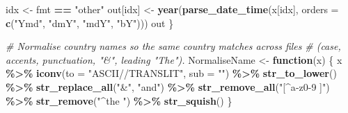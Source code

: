 \documentclass[
]{article}
\newenvironment{Shaded}{\begin{snugshade}}{\end{snugshade}}
\newcommand{\AttributeTok}[1]{\textcolor[rgb]{0.13,0.29,0.53}{#1}}
\newcommand{\CommentTok}[1]{\textcolor[rgb]{0.56,0.35,0.01}{\textit{#1}}}
\newcommand{\ControlFlowTok}[1]{\textcolor[rgb]{0.13,0.29,0.53}{\textbf{#1}}}
\newcommand{\FunctionTok}[1]{\textcolor[rgb]{0.13,0.29,0.53}{\textbf{#1}}}
\newcommand{\NormalTok}[1]{#1}
\newcommand{\OtherTok}[1]{\textcolor[rgb]{0.56,0.35,0.01}{#1}}
\newcommand{\SpecialCharTok}[1]{\textcolor[rgb]{0.81,0.36,0.00}{\textbf{#1}}}
\newcommand{\StringTok}[1]{\textcolor[rgb]{0.31,0.60,0.02}{#1}}
\begin{document}
\begin{Shaded}
\begin{Highlighting}[]
\NormalTok{  idx }\OtherTok{\textless{}{-}}\NormalTok{ fmt }\SpecialCharTok{==} \StringTok{"other"}
\NormalTok{  out[idx] }\OtherTok{\textless{}{-}} \FunctionTok{year}\NormalTok{(}\FunctionTok{parse\_date\_time}\NormalTok{(x[idx],}
                                   \AttributeTok{orders =} \FunctionTok{c}\NormalTok{(}\StringTok{"Ymd"}\NormalTok{, }\StringTok{"dmY"}\NormalTok{, }\StringTok{"mdY"}\NormalTok{, }\StringTok{"bY"}\NormalTok{)))}
\NormalTok{  out}
\NormalTok{\}}

\CommentTok{\# Normalise country names so the same country matches across files}
\CommentTok{\# (case, accents, punctuation, "\&", leading "The").}
\NormalTok{NormaliseName }\OtherTok{\textless{}{-}} \ControlFlowTok{function}\NormalTok{(x) \{}
\NormalTok{  x }\SpecialCharTok{\%\textgreater{}\%}
    \FunctionTok{iconv}\NormalTok{(}\AttributeTok{to =} \StringTok{"ASCII//TRANSLIT"}\NormalTok{, }\AttributeTok{sub =} \StringTok{""}\NormalTok{) }\SpecialCharTok{\%\textgreater{}\%}
    \FunctionTok{str\_to\_lower}\NormalTok{() }\SpecialCharTok{\%\textgreater{}\%}
    \FunctionTok{str\_replace\_all}\NormalTok{(}\StringTok{"\&"}\NormalTok{, }\StringTok{"and"}\NormalTok{) }\SpecialCharTok{\%\textgreater{}\%}
    \FunctionTok{str\_remove\_all}\NormalTok{(}\StringTok{"[\^{}a{-}z0{-}9 ]"}\NormalTok{) }\SpecialCharTok{\%\textgreater{}\%}
    \FunctionTok{str\_remove}\NormalTok{(}\StringTok{"\^{}the "}\NormalTok{) }\SpecialCharTok{\%\textgreater{}\%}
    \FunctionTok{str\_squish}\NormalTok{()}
\NormalTok{\}}


\end{Highlighting}
\end{Shaded}
\end{document}
